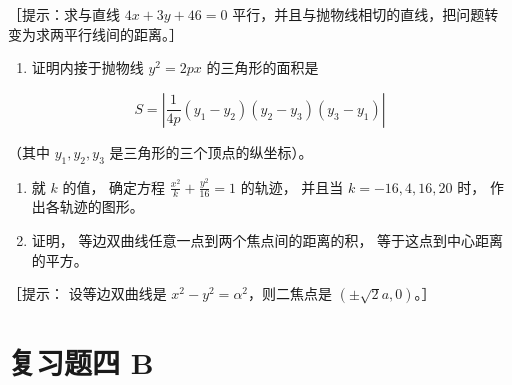 ［提示：求与直线 \(4x + 3y + 46 = 0\)
平行，并且与抛物线相切的直线，把问题转变为求两平行线间的距离。］

\begin{enumerate}
\def\labelenumi{\arabic{enumi}.}
\setcounter{enumi}{17}
\tightlist
\item
  证明内接于抛物线 \(y^{2} = 2px\) 的三角形的面积是
\end{enumerate}

\[
S = \left| \frac {1}{4 p} (y_{1} - y_{2}) (y_{2} - y_{3}) (y_{3} - y_{1}) \right|
\]

（其中 \(y_{1}, y_{2}, y_{3}\) 是三角形的三个顶点的纵坐标）。

\begin{enumerate}
\def\labelenumi{\arabic{enumi}.}
\setcounter{enumi}{18}
\item
  就 \(k\) 的值， 确定方程 \(\frac{x^2}{k} + \frac{y^2}{16} = 1\)
  的轨迹， 并且当 \(k = -16, 4, 16, 20\) 时， 作出各轨迹的图形。
\item
  证明， 等边双曲线任意一点到两个焦点间的距离的积，
  等于这点到中心距离的平方。
\end{enumerate}

［提示： 设等边双曲线是 \(x^{2}-y^{2}=\alpha^{2}\)，则二焦点是
\((\pm\sqrt{2}a,0)\)。］

\section{复习题四 B}\label{ux590dux4e60ux9898ux56db-b}

